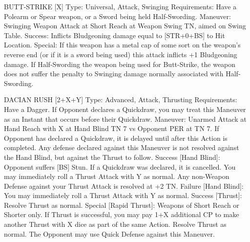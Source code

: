 \documentclass[oneside,11pt,english]{book}
\begin{document}
BUTT-STRIKE [X] 
Type: Universal, Attack, Swinging 
Requirements: Have a Polearm or Spear weapon, or a Sword being held Half-Swording. 
Maneuver: Swinging Weapon Attack at Short Reach at Weapon Swing TN, aimed on Swing Table. 
Success: Inflicts Bludgeoning damage equal to [STR+0+BS] to Hit Location. 
Special: If this weapon has a metal cap of some sort on the weapon’s reverse end (or if it is a sword being used) this attack inflicts +1 Bludgeoning damage. 
If Half-Swording the weapon being used for Butt-Strike, the weapon does not suffer the penalty to Swinging damage normally associated with Half-Swording. 


DACIAN RUSH [2+X+Y] 
Type: Advanced, Attack, Thrusting 
Requirements: Have a Dagger. If Opponent declares a Quickdraw, you may treat this Maneuver as an Instant that occurs before their Quickdraw.
Maneuver: Unarmed Attack at Hand Reach with X at Hand Blind TN 7 vs Opponent PER at TN 7. If Opponent has declared a Quickdraw, it is delayed until after this Action is completed. Any defense declared against this Maneuver is not resolved against the Hand Blind, but against the Thrust to follow. Success [Hand Blind]: Opponent suffers [BS] Stun. If a Quickdraw was declared, it is cancelled. You may immediately roll a Thrust Attack with Y as normal. Any non-Weapon Defense against your Thrust Attack is resolved at +2 TN.
Failure [Hand Blind]: You may immediately roll a Thrust Attack with Y as normal. 
Success [Thrust]: Resolve Thrust as normal. 
Special [Rapid Thrust]: Weapons of Short Reach or Shorter only. If Thrust is successful, you may pay 1+X additional CP to make another Thrust with X dice as part of the same Action. Resolve Thrust as normal. The Opponent may use Quick Defense against this Maneuver. 
\end{document}
